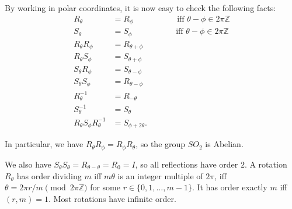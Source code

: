 \documentclass{amsart}
\newcommand{\Z}         {{\mathbb{Z}}}
\newcommand{\blob}      {circle(0.03cm)}
\renewcommand{\:}{\colon}
\theoremstyle{definition}
\begin{document}
\begin{center}
\end{center}

By working in polar coordinates, it is now easy to check the following
facts:
\begin{align*}
 R_\theta &= R_\phi \hspace{5em} \text{ iff } \theta-\phi\in 2\pi\Z \\
 S_\theta &= S_\phi \hspace{5em} \text{ iff } \theta-\phi\in 2\pi\Z \\
 R_\theta R_\phi &= R_{\theta+\phi} \\
 R_\theta S_\phi &= S_{\theta+\phi} \\
 S_\theta R_\phi &= S_{\theta-\phi} \\
 S_\theta S_\phi &= R_{\theta-\phi} \\
 R_\theta^{-1}   &= R_{-\theta}     \\
 S_\theta^{-1}   &= S_\theta        \\
 R_\theta S_\phi R_\theta^{-1} &= S_{\phi+2\theta}.
\end{align*}

In particular, we have $R_\theta R_\phi=R_\phi R_\theta$, so the group
$SO_2$ is Abelian.

We also have $S_\theta S_\theta=R_{\theta-\theta}=R_0=I$, so all reflections
have order $2$.  A rotation $R_\theta$ has order dividing $m$ iff
$m\theta$ is an integer multiple of $2\pi$, iff
$\theta=2\pi r/m\pmod{2\pi\Z}$ for some $r\in\{0,1,\ldots,m-1\}$.  It
has order exactly $m$ iff $(r,m)=1$.  Most rotations have infinite
order.

\end{document}
